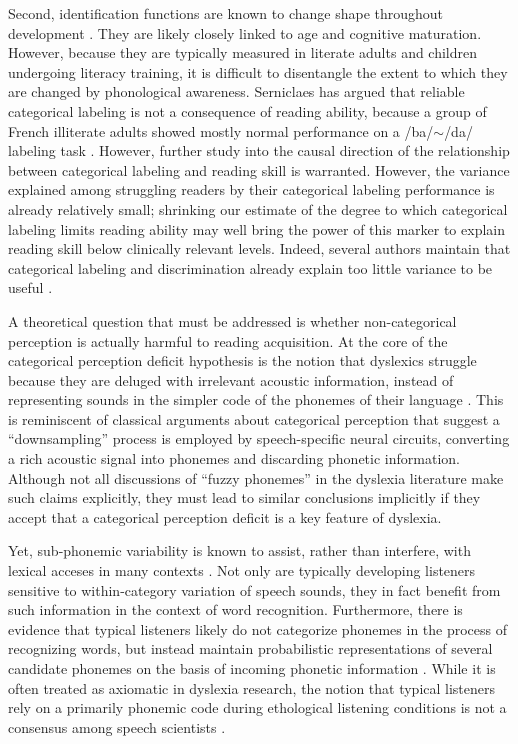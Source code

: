 \documentclass[../uwthesis.tex]{subfiles}
\begin{document}
Second, identification functions are known to change shape throughout development
\citep{Nittrouer1992}. They are likely closely linked to age and cognitive maturation. However,
because they are typically measured in literate adults and children undergoing literacy
training, it is difficult to disentangle the extent to which they are changed by phonological
awareness. Serniclaes has argued that reliable categorical labeling is not a consequence of
reading ability, because a group of French illiterate adults showed mostly normal
performance on a /ba/$\sim$/da/ labeling task \citep{Serniclaes2005}. However, further study into the causal direction of the relationship between categorical labeling and reading skill is warranted. However, the variance explained among struggling readers by their categorical labeling performance is already relatively small; shrinking our estimate of the degree to which categorical labeling limits reading ability may well bring the power of this marker to explain reading skill below clinically relevant levels. Indeed, several authors maintain that categorical labeling and discrimination already explain too little variance to be useful \citep{Rosen2001,Hazan2009,Messaoud-Galusi2011}.

A theoretical question that must be addressed is
whether non-categorical perception is actually harmful to reading acquisition. At the core of
the categorical perception deficit hypothesis is the notion that dyslexics struggle because they are deluged with irrelevant acoustic information, instead of representing sounds in the simpler code of the phonemes of their language \citep{Serniclaes2004}. This is reminiscent of classical arguments about categorical perception that suggest a “downsampling” process is employed by speech-specific neural circuits, converting a rich acoustic signal into phonemes and discarding phonetic information. Although not all discussions of “fuzzy phonemes” in the dyslexia literature make such claims explicitly, they must lead to similar conclusions implicitly if they accept that a categorical perception deficit is a key feature of dyslexia.

Yet, sub-phonemic variability is known to assist, rather than interfere, with lexical acceses in many contexts \citep{McLennan2003,Connine2004,Whalen1991,Marslen-Wilson1994,McQueen1999,Dahan2001}. Not only are typically developing listeners sensitive to within-category variation of speech sounds, they in fact benefit from such information in the context of word recognition. Furthermore, there is evidence that typical listeners likely do not categorize phonemes in the process of recognizing words, but instead maintain probabilistic representations of several candidate phonemes on the basis of incoming phonetic information \citep{Andruski1994,McMurray2009}. While it is often treated as axiomatic in dyslexia research, the notion that typical listeners rely on a primarily phonemic code during ethological listening conditions is not a consensus among speech scientists \citep{Cleary2001,Port2005,Port2007}.
\end{document}
